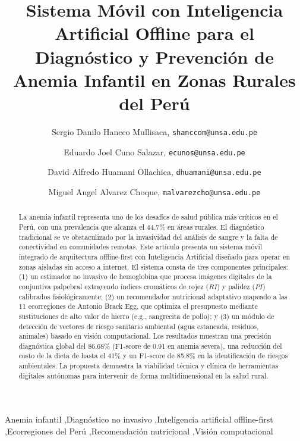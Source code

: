 \begin{frontmatter}

\title{Sistema Móvil con Inteligencia Artificial Offline para el Diagnóstico y Prevención de Anemia Infantil en Zonas Rurales del Perú}

\author[First]{Sergio Danilo Hancco Mullisaca, \texttt{shanccom@unsa.edu.pe}}

\author[First]{Eduardo Joel Cuno Salazar, \texttt{ecunos@unsa.edu.pe}}

\author[First]{David Alfredo Huamani Ollachica, \texttt{dhuamani@unsa.edu.pe}}

\author[First]{Miguel Angel Alvarez Choque, \texttt{malvarezcho@unsa.edu.pe}}


\address[First]{Universidad Nacional de San Agustín, Arequipa, Perú.}

\begin{abstract}
La anemia infantil representa uno de los desafíos de salud pública más críticos en el Perú, con una prevalencia que alcanza el 44.7\% en áreas rurales. El diagnóstico tradicional se ve obstaculizado por la invasividad del análisis de sangre y la falta de conectividad en comunidades remotas. Este artículo presenta un sistema móvil integrado de arquitectura offline-first con Inteligencia Artificial diseñado para operar en zonas aisladas sin acceso a internet. El sistema consta de tres componentes principales: (1) un estimador no invasivo de hemoglobina que procesa imágenes digitales de la conjuntiva palpebral extrayendo índices cromáticos de rojez ($RI$) y palidez ($PI$) calibrados fisiológicamente; (2) un recomendador nutricional adaptativo mapeado a las 11 ecorregiones de Antonio Brack Egg, que optimiza el presupuesto mediante sustituciones de alto valor de hierro (e.g., sangrecita de pollo); y (3) un módulo de detección de vectores de riesgo sanitario ambiental (agua estancada, residuos, animales) basado en visión computacional. Los resultados muestran una precisión diagnóstica global del 86.68\% (F1-score de 0.91 en anemia severa), una reducción del costo de la dieta de hasta el 41\% y un F1-score de 85.8\% en la identificación de riesgos ambientales. La propuesta demuestra la viabilidad técnica y clínica de herramientas digitales autónomas para intervenir de forma multidimensional en la salud rural.
\end{abstract}

\begin{keyword}
Anemia infantil \sep Diagnóstico no invasivo \sep Inteligencia artificial offline-first \sep Ecorregiones del Perú \sep Recomendación nutricional \sep Visión computacional
\end{keyword}

\end{frontmatter}
